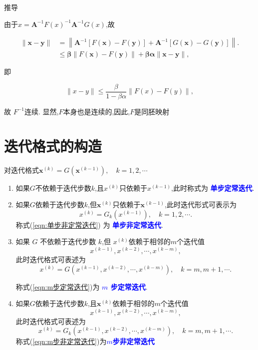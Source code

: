 \documentclass{lzureport}
\begin{document}
\begin{derivation}{推导}
\begin{enumerate}[itemindent=1em,label=\arabic*)]
	由于$x = \boldsymbol{A}^{-1} F(x)^{-1}\boldsymbol{A}^{-1}G(x)$,故

	$$\begin{aligned}\|\boldsymbol{x}-\boldsymbol{y}\|&=\left\|\boldsymbol{A}^{-1}[F(\boldsymbol{x})-F(\boldsymbol{y})]+\boldsymbol{A}^{-1}[G(\boldsymbol{x})-G(\boldsymbol{y})]\right\|.\\&\leqslant\boldsymbol{\beta}\|F(\boldsymbol{x})-F(\boldsymbol{y})\|+\boldsymbol{\beta}\boldsymbol{\alpha}\|\boldsymbol{x}-\boldsymbol{y}\|,\end{aligned}$$

	即

	$$\|x-y\|\leqslant\frac\beta{1-\beta\alpha}\|F(x)-F(y)\|,$$

	故 $F^{-1}$连续. 显然,$F$本身也是连续的,因此,$F$是同胚映射
\end{enumerate}

\end{derivation}

\section{迭代格式的构造}
对迭代格式$\boldsymbol{x}^{(k)}=G\left(\boldsymbol{x}^{(k-1)}\right),\quad k=1,2,\cdots $

\begin{enumerate}[label=\arabic*)]
	\item 如果$G$\textcolor{YBXPurple}{不依赖}于迭代步数$k$,且$x^{(k)}$只依赖于$x^{(k-1)}$,此时称式为 \textcolor{blue}{\textbf{单步定常迭代}}.
	\item 如果$G$\textcolor{YBXPurple}{依赖}于迭代步数$k$,但$\boldsymbol x^{(k)}$只依赖于$\boldsymbol x^{(k-1)}$,此时迭代形式可表示为
	\begin{equation}\label{eqn:单步非定常迭代}	
	x^{(k)}=G_k\left(x^{(k-1)}\right),\quad k=1,2,\cdots.
	\end{equation}
	称式(\ref{eqn:单步非定常迭代}) 为 \textcolor{blue}{\textbf{单步非定常迭代}}.
	\item 如果 $G$ \textcolor{YBXPurple}{不依赖}于迭代步数 $k$,但 $x^{(k)}$依赖于相邻的$m$个迭代值
	$$x^{(k-1)},x^{(k-2)},\cdots,x^{(k-m)},$$
	此时迭代格式可表述为
	\begin{equation}\label{eqn:m步定常迭代}
	x^{(k)}=G\left(x^{(k-1)},x^{(k-2)},\cdots,x^{(k-m)}\right),\quad k=m,m+1,\cdots.
	\end{equation}
	
	称式(\ref{eqn:m步定常迭代})为 \textcolor{blue}{\textbf{$m$ 步定常迭代}}.
	\item 如果$G$\textcolor{YBXPurple}{依赖}于迭代步数$k$,且$\boldsymbol x^{(k)}$依赖于相邻的$m$个迭代值
	$$x^{(k-1)},x^{(k-2)},\cdots,x^{(k-m)},$$
	此时迭代格式可表述为
	\begin{equation}\label{eqn:m步非定常迭代}
	x^{(k)}=G_k\left(x^{(k-1)},x^{(k-2)},\cdots,x^{(k-m)}\right),\quad k=m,m+1,\cdots.
	\end{equation}
	称式(\ref{eqn:m步非定常迭代})为\textcolor{blue}{\textbf{$m$步非定常迭代}}
\end{enumerate}
\end{document}
